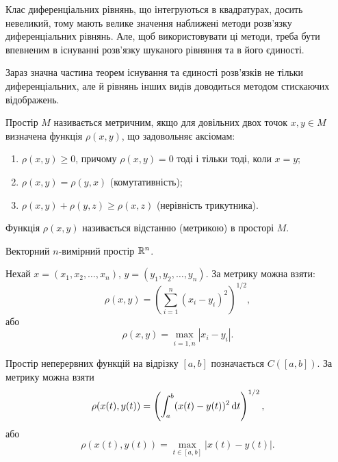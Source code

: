 Клас диференціальних рівнянь, що інтегруються в квадратурах, досить невеликий, тому мають велике значення наближені методи розв'язку диференціальних рівнянь. Але, щоб використовувати ці методи, треба бути впевненим в існуванні розв'язку шуканого рівняння та в його єдиності. \parvskip

Зараз значна частина теорем існування та єдиності розв'язків не тільки диференціальних, але й рівнянь інших видів доводиться методом стискаючих відображень. \parvskip

\begin{definition} 
	Простір $M$ називається метричним, якщо для довільних двох точок $x,y\in M$ визначена функція $\rho(x,y)$, що задовольняє аксіомам:
	\begin{enumerate}
		\item $\rho(x, y)\ge0$, причому $\rho(x,y)=0$ тоді і тільки тоді, коли $x=y$;
		\item $\rho(x,y)=\rho(y,x)$ (комутативність);
		\item $\rho(x,y)+\rho(y,z)\ge\rho(x,z)$ (нерівність трикутника).
	\end{enumerate}

	Функція $\rho(x,y)$ називається відстанню (метрикою) в просторі $M$.
\end{definition}

\begin{example} 
	Векторний $n$-вимірний простір $\mathbb{R}^n$. \parvskip

	Нехай $x=(x_1,x_2,\ldots,x_n)$, $y=(y_1,y_2,\ldots,y_n)$. За метрику можна взяти: 
	\begin{equation*}
		\rho(x,y)=\left(\sum_{i=1}^n (x_i-y_i)^2\right)^{1/2},
	\end{equation*}
	або 
	\begin{equation*}
		\rho(x,y)=\max_{i=\overline{1,n}}|x_i-y_i|.
	\end{equation*}
\end{example}

\begin{example} 
	Простір неперервних функцій на відрізку $[a,b]$ позначається $C([a,b])$. За метрику можна взяти
		\begin{equation*}
		\rho(x(t), y(t)) = \left(\int_a^b (x(t)-y(t))^2 \mathop{}\!\mathrm{d} t\right)^{1/2},
	\end{equation*}
	або
	\begin{equation*}
		\rho(x(t), y(t)) = \max_{t\in[a,b]} |x(t)-y(t)|.
	\end{equation*}
\end{example}


